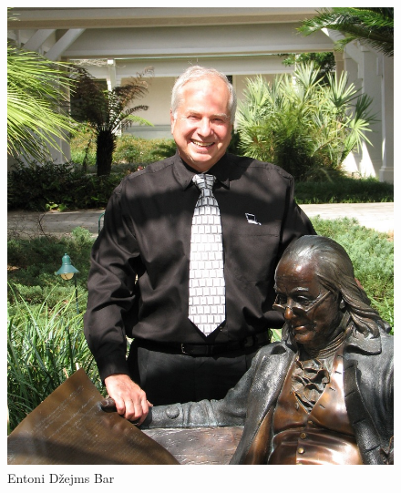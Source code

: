 \documentclass[a4paper]{article}
\begin{document}
{
		
		\begin{figure}[h!]
			\begin{center}
				\includegraphics[scale=0.7]{TonyBarr.jpg}
			\end{center}
			\caption{Entoni Džejms Bar}
		\end{figure}
		
		\newpage
		
}
\end{document}
